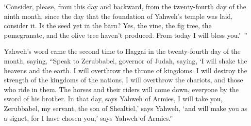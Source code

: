 {‘Consider, please, from this day and backward, from the twenty-fourth day of the ninth month, since the day that the foundation of Yahweh’s temple was laid, consider it.
Is the seed yet in the barn? Yes, the vine, the fig tree, the pomegranate, and the olive tree haven’t produced. From today I will bless you.’ ”
\par }{\PP {}Yahweh’s word came the second time to Haggai in the twenty-fourth day of the month, saying,
“Speak to Zerubbabel, governor of Judah, saying, ‘I will shake the heavens and the earth.
I will overthrow the throne of kingdoms. I will destroy the strength of the kingdoms of the nations. I will overthrow the chariots, and those who ride in them. The horses and their riders will come down, everyone by the sword of his brother.
In that day, says Yahweh of Armies, I will take you, Zerubbabel, my servant, the son of Shealtiel,’ says Yahweh, ‘and will make you as a signet, for I have chosen you,’ says Yahweh of Armies.”
\par }